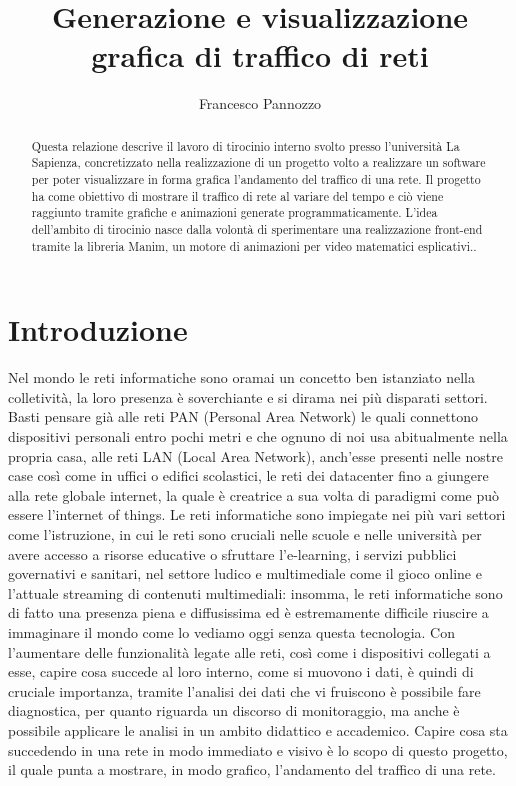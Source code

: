 \documentclass[binding=0.6cm]{sapthesis}
\title{Generazione e visualizzazione grafica di traffico di reti}
\author{Francesco Pannozzo}
\begin{document}
\frontmatter
\maketitle
\dedication{Dedicato alla\\ mia famiglia}
\begin{abstract}
Questa relazione descrive il lavoro di tirocinio interno svolto presso l'università La Sapienza, 
concretizzato nella realizzazione 
di un progetto volto a realizzare un software per poter visualizzare in forma grafica l'andamento 
del traffico di una rete.
Il progetto ha come obiettivo di mostrare il traffico di rete al variare del tempo e ciò viene raggiunto
tramite grafiche e animazioni generate programmaticamente. L'idea dell'ambito di tirocinio nasce 
dalla volontà di sperimentare una realizzazione front-end tramite la libreria Manim, un motore di animazioni per video
matematici esplicativi..

\end{abstract}
\tableofcontents
\mainmatter
\chapter{Introduzione}
Nel mondo le reti informatiche sono oramai un concetto ben istanziato 
nella colletività, la loro presenza è soverchiante e si dirama nei più disparati settori.
Basti pensare già alle  reti PAN (Personal Area Network) le quali connettono dispositivi
personali entro pochi metri e che ognuno di noi usa abitualmente nella propria casa, 
alle reti LAN (Local Area Network), 
anch'esse presenti
nelle nostre case così come in uffici o edifici scolastici, le reti dei datacenter 
fino a giungere alla rete globale internet, la quale è creatrice a sua volta di paradigmi come
può essere l'internet of things. Le reti informatiche sono impiegate nei più vari 
settori come l'istruzione, in cui le reti
sono cruciali nelle scuole e nelle università per avere accesso a risorse educative o sfruttare l'e-learning, i servizi
pubblici governativi e sanitari, nel settore ludico e multimediale come il gioco online e l'attuale
streaming di contenuti multimediali: insomma, le reti informatiche sono di fatto una presenza piena e diffusissima
ed è estremamente difficile riuscire a immaginare il mondo come lo vediamo oggi senza questa tecnologia.
Con l'aumentare delle funzionalità legate alle reti, così come i dispositivi collegati a esse, capire cosa succede al
loro interno, come si muovono i dati, è quindi di cruciale importanza, tramite l'analisi dei dati che vi fruiscono è possibile fare diagnostica, per quanto
riguarda un discorso di monitoraggio, ma anche è possibile applicare le analisi in un ambito didattico e accademico.
Capire cosa sta succedendo in una rete in modo immediato e visivo è lo scopo di questo progetto, il quale punta a mostrare,
in modo grafico, l'andamento del traffico di una rete.
\end{document}
